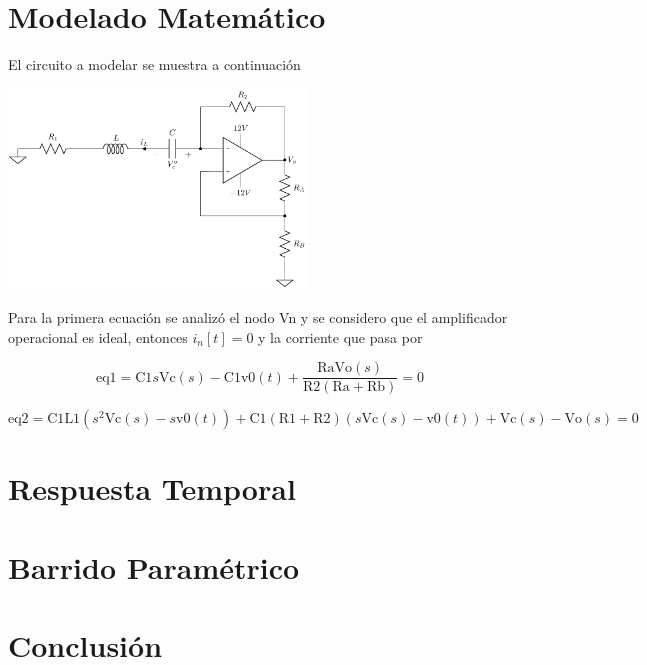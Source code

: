 \documentclass[10pt,a4paper]{article} %
\begin{document}
\section{Modelado Matemático}
El circuito a modelar se muestra a continuación %
\begin{center}
    \includegraphics[width=300px]{circuito}
\end{center} 
Para la primera ecuación se analizó el nodo Vn y se considero que el amplificador operacional es ideal, entonces $i_{n}[t]=0$
y la corriente que pasa por %

 \begin{equation}
\text{eq1}=\text{C1} s \text{Vc}(s)-\text{C1} \text{v0}(t)+\frac{\text{Ra} \text{Vo}(s)}{\text{R2} (\text{Ra}+\text{Rb})}=0
\end{equation}

\begin{equation}
\text{eq2}=\text{C1} \text{L1} \left(s^2 \text{Vc}(s)-s \text{v0}(t)\right)+\text{C1} (\text{R1}+\text{R2}) (s \text{Vc}(s)-\text{v0}(t))+\text{Vc}(s)-\text{Vo}(s)=0
\end{equation}




\section{Respuesta Temporal}
\section{Barrido Paramétrico}
\section{Conclusión}
\end{document}
